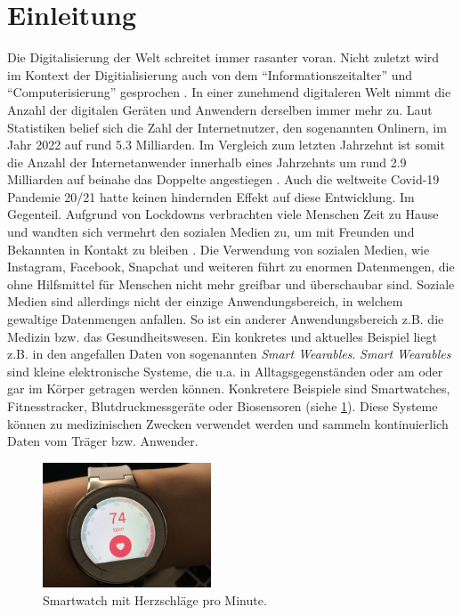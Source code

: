 \section{Einleitung}
\label{sec1:intro}
Die Digitalisierung der Welt schreitet immer rasanter voran. Nicht zuletzt wird im Kontext der Digitialisierung auch von dem \enquote{Informationszeitalter} und \enquote{Computerisierung} gesprochen \cite{gabler-digitalisierung}.
In einer zunehmend digitaleren Welt nimmt die Anzahl der digitalen Geräten und Anwendern derselben immer mehr zu.
Laut Statistiken belief sich die Zahl der Internetnutzer, den sogenannten Onlinern, im Jahr 2022 auf rund 5.3 Milliarden. 
Im Vergleich zum letzten Jahrzehnt ist somit die Anzahl der Internetanwender innerhalb eines Jahrzehnts um rund 2.9 Milliarden auf beinahe das Doppelte angestiegen \cite{statista-onliner-2022}.
Auch die weltweite Covid-19 Pandemie 20/21 hatte keinen hindernden Effekt auf diese Entwicklung.
Im Gegenteil.
Aufgrund von Lockdowns verbrachten viele Menschen Zeit zu Hause und wandten sich vermehrt den sozialen Medien zu, um mit Freunden und Bekannten in Kontakt zu bleiben \cite{statista-covid-social-media-use}.
Die Verwendung von sozialen Medien, wie Instagram, Facebook, Snapchat und weiteren führt zu enormen Datenmengen, die ohne Hilfsmittel für Menschen nicht mehr greifbar und überschaubar sind.
\med
Soziale Medien sind allerdings nicht der einzige Anwendungsbereich, in welchem gewaltige Datenmengen anfallen.
So ist ein anderer Anwendungsbereich z.B. die Medizin bzw. das Gesundheitswesen.
Ein konkretes und aktuelles Beispiel liegt z.B. in den angefallen Daten von sogenannten \textit{Smart Wearables}. 
\textit{Smart Wearables} sind kleine elektronische Systeme, die u.a. in Alltagsgegenständen oder am oder gar im Körper getragen werden können.
Konkretere Beispiele sind Smartwatches, Fitnesstracker, Blutdruckmessgeräte oder Biosensoren (siehe \cref{sec1:intro:fig:smart-watch}).
Diese Systeme können zu medizinischen Zwecken verwendet werden und sammeln kontinuierlich Daten vom Träger bzw. Anwender.
\par
\begin{figure}[htb]
    \centering
    \includegraphics[width=5cm]{resources/images/smartwatch.jpg}
    \caption{Smartwatch mit Herzschläge pro Minute.}
    \label{sec1:intro:fig:smart-watch}
\end{figure}
